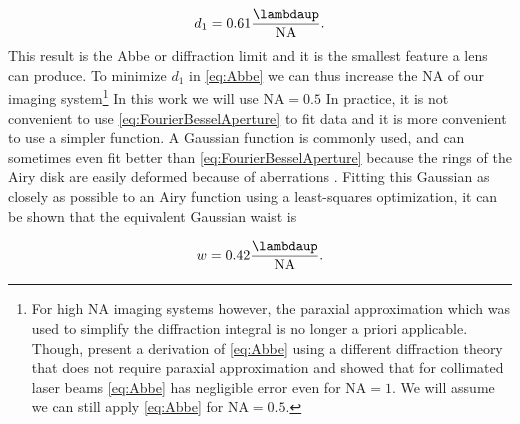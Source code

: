 \begin{equation}\label{eq:Abbe}
    d_1 = 0.61 \frac{\lambdaup}{\text{NA}}.
\end{equation}
This result is the Abbe or diffraction limit \cite{Abbe1882} and it is the smallest feature a lens can produce.
To minimize $d_1$ in \cref{eq:Abbe} we can thus increase the \ac{NA} of our imaging system\footnote{For high NA imaging systems however, the paraxial approximation which was used to simplify the diffraction integral is no longer a priori applicable. 
Though, \cite{Chon2007} present a derivation of \cref{eq:Abbe} using a different diffraction theory that does not require paraxial approximation and showed that for collimated laser beams \cref{eq:Abbe} has negligible error even for $\text{NA} = 1$. 
We will assume we can still apply \cref{eq:Abbe} for $\text{NA} = 0.5$.}
In this work we will use $\text{NA} = 0.5$
In practice, it is not convenient to use \cref{eq:FourierBesselAperture} to fit data and it is more convenient to use a simpler function. 
A Gaussian function is commonly used, and can sometimes even fit better than \cref{eq:FourierBesselAperture} because the rings of the Airy disk are easily deformed because of aberrations \cite{Knottnerus2018}.
Fitting this Gaussian as closely as possible to an Airy function using a least-squares optimization, it can be shown that the equivalent Gaussian waist is \cite{Zhang2007}

\begin{equation}\label{eq:GaussianAiryFit}
    w = 0.42 \frac{\lambdaup}{\text{NA}}.
\end{equation}

